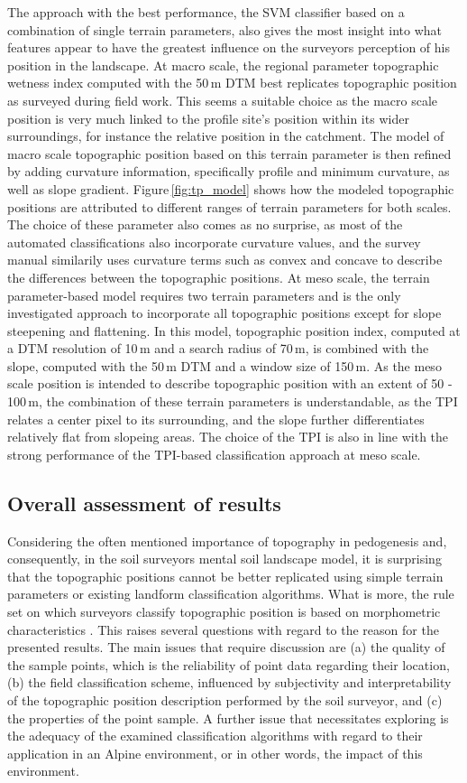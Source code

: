 \documentclass[preprint,12pt,authoryear]{elsarticle}
\begin{document}
The approach with the best performance, the SVM classifier based on a combination of single terrain parameters, also gives the most insight into what features appear to have the greatest influence on the surveyors perception of his position in the landscape. At macro scale, the regional parameter topographic wetness index computed with the 50\,m DTM best replicates topographic position as surveyed during field work. This seems a suitable choice as the macro scale position is very much linked to the profile site's position within its wider surroundings, for instance the relative position in the catchment. The model of macro scale topographic position based on this terrain parameter is then refined by adding curvature information, specifically profile and minimum curvature, as well as slope gradient. Figure\,\ref{fig:tp_model} shows how the modeled topographic positions are attributed to different ranges of terrain parameters for both scales. The choice of these parameter also comes as no surprise, as most of the automated classifications also incorporate curvature values, and the survey manual similarily uses curvature terms such as convex and concave to describe the differences between the topographic positions. At meso scale, the terrain parameter-based model requires two terrain parameters and is the only investigated approach to incorporate all topographic positions except for slope steepening and flattening. In this model, topographic position index, computed at a DTM resolution of 10\,m and a search radius of 70\,m, is combined with the slope, computed with the 50\,m DTM and a window size of 150\,m. As the meso scale position is intended to describe topographic position with an extent of 50 - 100\,m, the combination of these terrain parameters is understandable, as the TPI relates a center pixel to its surrounding, and the slope further differentiates relatively flat from slopeing areas. The choice of the TPI is also in line with the strong performance of the TPI-based classification approach at meso scale.
\subsection{Overall assessment of results}
Considering the often mentioned importance of topography in pedogenesis and, consequently, in the soil surveyors mental soil landscape model, it is surprising that the topographic positions cannot be better replicated using simple terrain parameters or existing landform classification algorithms. What is more, the rule set on which surveyors classify topographic position is based on morphometric characteristics \citep{Englisch1998}. This raises several questions with regard to the reason for the presented results. The main issues that require discussion are (a) the quality of the sample points, which is the reliability of point data regarding their location, (b) the field classification scheme, influenced by subjectivity and interpretability of the topographic position description performed by the soil surveyor, and (c) the properties of the point sample. A further issue that necessitates exploring is the adequacy of the examined classification algorithms with regard to their application in an Alpine environment, or in other words, the impact of this environment. 
\end{document}
